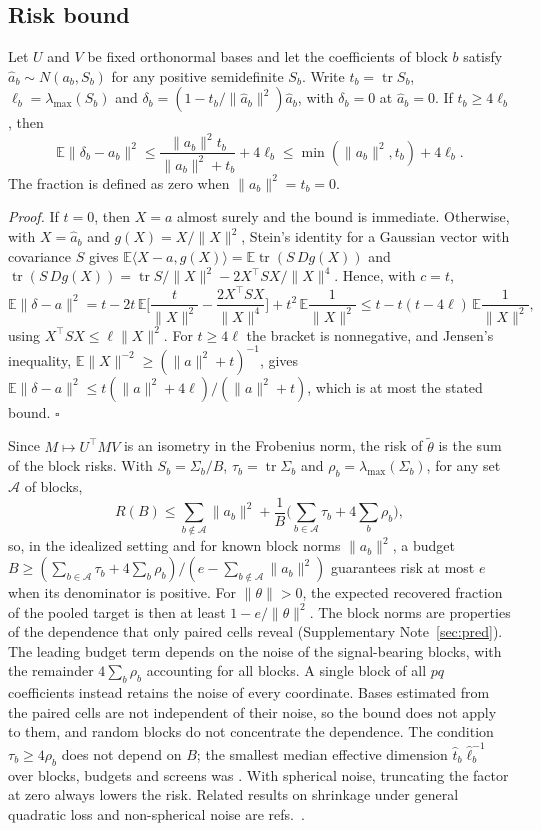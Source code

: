 \subsection*{Risk bound}
\begin{proposition}\label{prop:bjs}
Let $U$ and $V$ be fixed orthonormal bases and let the coefficients of block $b$ satisfy $\hat a_b\sim N(a_b,S_b)$ for any positive semidefinite $S_b$. Write $t_b=\operatorname{tr}S_b$, $\ell_b=\lambda_{\max}(S_b)$ and $\delta_b=(1-t_b/\|\hat a_b\|^2)\hat a_b$, with $\delta_b=0$ at $\hat a_b=0$. If $t_b\ge4\ell_b$, then
\[
\mathbb{E}\|\delta_b-a_b\|^2\le\frac{\|a_b\|^2t_b}{\|a_b\|^2+t_b}+4\ell_b\le\min(\|a_b\|^2,t_b)+4\ell_b .
\]
The fraction is defined as zero when $\|a_b\|^2=t_b=0$.
\end{proposition}
\noindent\textit{Proof.} If $t=0$, then $X=a$ almost surely and the bound is immediate. Otherwise, with $X=\hat a_b$ and $g(X)=X/\|X\|^2$, Stein's identity for a Gaussian vector with covariance $S$\cite{stein1981} gives $\mathbb{E}\langle X-a,g(X)\rangle=\mathbb{E}\operatorname{tr}(S\,Dg(X))$ and $\operatorname{tr}(S\,Dg(X))=\operatorname{tr}S/\|X\|^2-2X^\top SX/\|X\|^4$. Hence, with $c=t$,
\[
\mathbb{E}\|\delta-a\|^2=t-2t\,\mathbb{E}\Big[\frac{t}{\|X\|^2}-\frac{2X^\top SX}{\|X\|^4}\Big]+t^2\,\mathbb{E}\frac{1}{\|X\|^2}\le t-t(t-4\ell)\,\mathbb{E}\frac{1}{\|X\|^2},
\]
using $X^\top SX\le\ell\|X\|^2$. For $t\ge4\ell$ the bracket is nonnegative, and Jensen's inequality, $\mathbb{E}\|X\|^{-2}\ge(\|a\|^2+t)^{-1}$, gives $\mathbb{E}\|\delta-a\|^2\le t(\|a\|^2+4\ell)/(\|a\|^2+t)$, which is at most the stated bound. $\square$

Since $M\mapsto U^\top MV$ is an isometry in the Frobenius norm, the risk of $\tilde\theta$ is the sum of the block risks. With $S_b=\Sigma_b/B$, $\tau_b=\operatorname{tr}\Sigma_b$ and $\rho_b=\lambda_{\max}(\Sigma_b)$, for any set $\mathcal{A}$ of blocks,
\[
R(B)\le\sum_{b\notin\mathcal{A}}\|a_b\|^2+\frac{1}{B}\Big(\sum_{b\in\mathcal{A}}\tau_b+4\sum_b\rho_b\Big),
\]
so, in the idealized setting and for known block norms $\|a_b\|^2$, a budget $B\ge(\sum_{b\in\mathcal{A}}\tau_b+4\sum_b\rho_b)/(e-\sum_{b\notin\mathcal{A}}\|a_b\|^2)$ guarantees risk at most $e$ when its denominator is positive. For $\|\theta\|>0$, the expected recovered fraction of the pooled target is then at least $1-e/\|\theta\|^2$. The block norms are properties of the dependence that only paired cells reveal (Supplementary Note~\ref{sec:pred}). The leading budget term depends on the noise of the signal-bearing blocks, with the remainder $4\sum_b\rho_b$ accounting for all blocks. A single block of all $pq$ coefficients instead retains the noise of every coordinate. Bases estimated from the paired cells are not independent of their noise, so the bound does not apply to them, and random blocks do not concentrate the dependence. The condition $\tau_b\ge4\rho_b$ does not depend on $B$; the smallest median effective dimension $\hat t_b\hat\ell_b^{-1}$ over blocks, budgets and screens was \SpEffDimMin. With spherical noise, truncating the factor at zero always lowers the risk\cite{baranchik1970}. Related results on shrinkage under general quadratic loss and non-spherical noise are refs.~.

